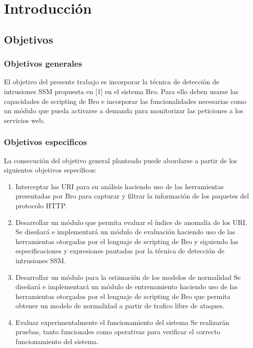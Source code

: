 \chapter{Introducción}
\label{capitulo1}


\section{Objetivos}
\subsection{Objetivos generales}
El objetivo del presente trabajo es incorporar la técnica de detección de intrusiones SSM propuesta en [1] en el sistema Bro. Para ello deben usarse las capacidades de scripting de Bro e incorporar las funcionalidades necesarias como un módulo que pueda activarse a demanda para monitorizar las peticiones a los servicios web.
\subsection{Objetivos especificos}
La consecución del objetivo general planteado puede abordarse a partir de los siguientes objetivos específicos:

\begin{enumerate}
\item Interceptar las URI para su análisis haciendo uso de las herramientas presentadas por Bro para capturar y filtrar la información de los paquetes del protocolo HTTP.
\item Desarrollar un módulo que permita evaluar el índice de anomalía de los URI.
Se diseñará e implementará un módulo de evaluación haciendo uso de las herramientas otorgadas por el lenguaje de scripting de Bro y siguiendo las especificaciones y expresiones pautadas por la técnica de detección de intrusiones SSM. 
\item Desarrollar un módulo para la estimación de los modelos de normalidad
Se diseñará e implementará un módulo de entrenamiento haciendo uso de las herramientas otorgadas por el lenguaje de scripting de Bro que permita obtener un modelo de normalidad a partir de trafico libre de ataques.
\item Evaluar experimentalmente el funcionamiento del sistema
Se realizarán pruebas, tanto funcionales como operativas para verificar el correcto funcionamiento del sistema.
\end{enumerate}

